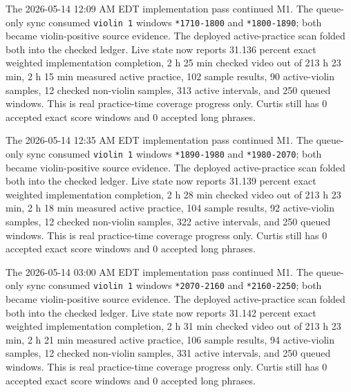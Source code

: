 The 2026-05-14 12:09 AM EDT implementation pass continued M1. The queue-only sync consumed \texttt{violin 1} windows \texttt{*1710-1800} and \texttt{*1800-1890}; both became violin-positive source evidence. The deployed active-practice scan folded both into the checked ledger. Live state now reports 31.136 percent exact weighted implementation completion, 2 h 25 min checked video out of 213 h 23 min, 2 h 15 min measured active practice, 102 sample results, 90 active-violin samples, 12 checked non-violin samples, 313 active intervals, and 250 queued windows. This is real practice-time coverage progress only. Curtis still has 0 accepted exact score windows and 0 accepted long phrases.

The 2026-05-14 12:35 AM EDT implementation pass continued M1. The queue-only sync consumed \texttt{violin 1} windows \texttt{*1890-1980} and \texttt{*1980-2070}; both became violin-positive source evidence. The deployed active-practice scan folded both into the checked ledger. Live state now reports 31.139 percent exact weighted implementation completion, 2 h 28 min checked video out of 213 h 23 min, 2 h 18 min measured active practice, 104 sample results, 92 active-violin samples, 12 checked non-violin samples, 322 active intervals, and 250 queued windows. This is real practice-time coverage progress only. Curtis still has 0 accepted exact score windows and 0 accepted long phrases.

The 2026-05-14 03:00 AM EDT implementation pass continued M1. The queue-only sync consumed \texttt{violin 1} windows \texttt{*2070-2160} and \texttt{*2160-2250}; both became violin-positive source evidence. The deployed active-practice scan folded both into the checked ledger. Live state now reports 31.142 percent exact weighted implementation completion, 2 h 31 min checked video out of 213 h 23 min, 2 h 21 min measured active practice, 106 sample results, 94 active-violin samples, 12 checked non-violin samples, 331 active intervals, and 250 queued windows. This is real practice-time coverage progress only. Curtis still has 0 accepted exact score windows and 0 accepted long phrases.

